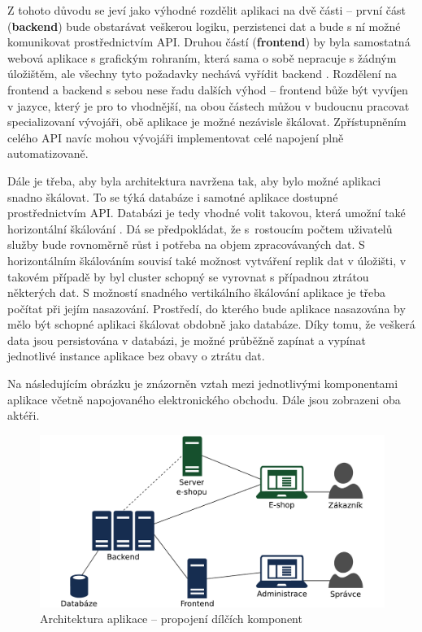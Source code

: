 \documentclass[FM,DP]{tulthesis}
\begin{document}
Z tohoto důvodu se jeví jako výhodné rozdělit aplikaci na dvě části -- první část (\textbf{backend}) 
bude obstarávat veškerou logiku, perzistenci dat a bude s ní možné komunikovat prostřednictvím API. 
Druhou částí (\textbf{frontend}) by byla samostatná webová aplikace s grafickým rohraním, která 
sama o sobě nepracuje s žádným úložištěm, ale všechny tyto požadavky nechává vyřídit backend \cite{backend}. 
Rozdělení na frontend a backend s sebou nese řadu dalších výhod -- frontend bůže být vyvíjen
v jazyce, který je pro to vhodnější, na obou částech můžou v budoucnu pracovat specializovaní
vývojáři, obě aplikace je možné nezávisle škálovat. Zpřístupněním celého API navíc mohou
vývojáři implementovat celé napojení plně automatizovaně.

Dále je třeba, aby byla architektura navržena tak, aby bylo možné aplikaci snadno škálovat. 
To se týká databáze i samotné aplikace dostupné prostřednictvím API. Databázi je tedy
vhodné volit takovou, která umožní také horizontální škálování \cite{scaling}. Dá se předpokládat, 
že s~rostoucím počtem uživatelů služby bude rovnoměrně růst i potřeba na objem zpracovávaných
dat. S horizontálním škálováním souvisí také možnost vytváření replik dat v úložišti, 
v takovém případě by byl cluster schopný se vyrovnat s případnou ztrátou některých dat.
S možností snadného vertikálního škálování aplikace je třeba počítat při jejím nasazování.
Prostředí, do kterého bude aplikace nasazována by mělo být schopné aplikaci škálovat
obdobně jako databáze. Díky tomu, že veškerá data jsou persistována v databázi, je možné
průběžně zapínat a vypínat jednotlivé instance aplikace bez obavy o ztrátu dat.

Na následujícím obrázku je znázorněn vztah mezi jednotlivými komponentami aplikace včetně
napojovaného elektronického obchodu. Dále jsou zobrazeni oba aktéři.

\begin{figure}[h]
\center
\includegraphics[width=\textwidth]{architektura.pdf}
\caption[Architektura aplikace]{Architektura aplikace -- propojení dílčích komponent}
\label{architektura}
\end{figure}
\end{document}
